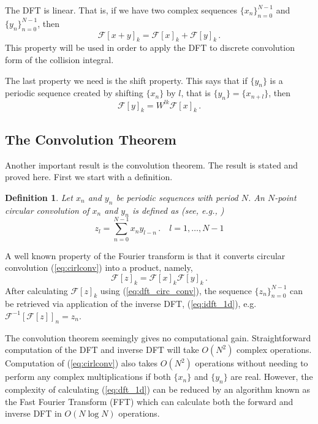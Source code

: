 \documentclass[12pt]{CSUNthesis}
\newtheorem{definition}{Definition}
\def\calF{\mathcal{F}}
\begin{document}
The DFT is linear. That is, if we have two complex sequences $\{x_n\}_{n=0}^{N-1}$ and $\{y_n\}_{n=0}^{N-1}$, then 
\begin{equation}
\label{eq:dft_lin}
\calF[x+y]_k = \calF[x]_k + \calF[y]_k\, .
\end{equation}
This property will be used in order to apply the DFT to discrete convolution form of the collision integral.

The last property we need is the shift property. This says that if $\{y_n\}$ is a periodic sequence created by shifting $\{x_n\}$ by $l$, that is $\{y_n\} = \{x_{n+l}\}$, then
\begin{equation}
\label{eq:shift_prop}
\calF[y]_k = W^{lk}\calF[x]_k\, .
\end{equation}

\subsection{The Convolution Theorem}
Another important result is the convolution theorem. The result is stated and proved here. First we start with a definition.
\begin{definition}
Let $x_{n}$ and $y_{n}$ be periodic sequences with period $N$. An $N$-point circular 
convolution of $x_{n}$ and $y_{n}$ is defined as (see, e.g., \cite{Nussbaumer1982})
\begin{equation}
\label{eq:cirlconv}
z_{l}=\sum_{n=0}^{N-1} x_{n}y_{l-n}\, . \quad l=1,\dots,N-1
\end{equation} 
\end{definition}
A well known property of the Fourier transform is that it converts circular 
convolution (\ref{eq:cirlconv}) into a product, namely, 
\begin{equation}
\label{eq:dft_circ_conv}
\calF[z]_{k}=\calF[x]_{k}\calF[y]_{k}\, .
\end{equation}
After calculating $\calF[z]_k$ using (\ref{eq:dft_circ_conv}), the sequence $\{z_n\}_{n=0}^{N-1}$ can be retrieved via application of the inverse DFT, (\ref{eq:idft_1d}), e.g. $\calF^{-1}[\calF[z]]_n = z_n$. 


The convolution theorem seemingly gives no computational gain. Straightforward computation of the DFT and inverse DFT will take $O(N^2)$ complex operations. Computation of (\ref{eq:cirlconv}) also takes $O(N^2)$ operations without needing to perform any complex multiplications if both $\{x_n\}$ and $\{y_n\}$ are real. However, the complexity of calculating (\ref{eq:dft_1d}) can be reduced by an algorithm known as the Fast Fourier Transform (FFT) which can calculate both the forward and inverse DFT in $O(N \log N)$ operations.
\end{document}

